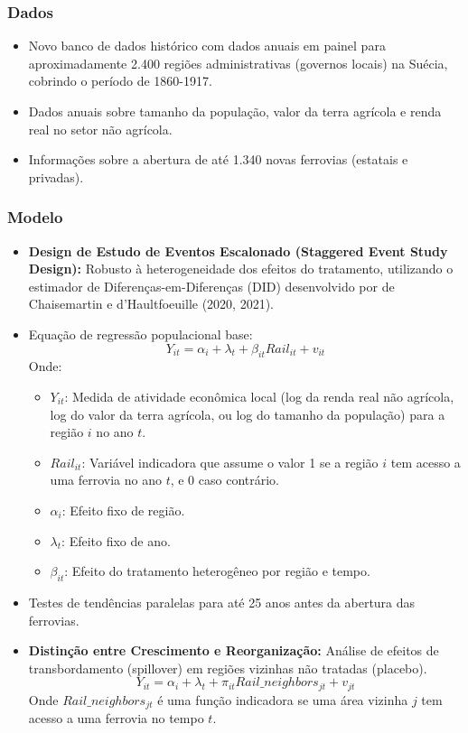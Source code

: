 \documentclass[12pt]{article}
\begin{document}
\subsubsection*{Dados}
\begin{itemize}
    \item Novo banco de dados histórico com dados anuais em painel para aproximadamente 2.400 regiões administrativas (governos locais) na Suécia, cobrindo o período de 1860-1917.
    \item Dados anuais sobre tamanho da população, valor da terra agrícola e renda real no setor não agrícola.
    \item Informações sobre a abertura de até 1.340 novas ferrovias (estatais e privadas).
\end{itemize}

\subsubsection*{Modelo}
\begin{itemize}
    \item \textbf{Design de Estudo de Eventos Escalonado (Staggered Event Study Design):} Robusto à heterogeneidade dos efeitos do tratamento, utilizando o estimador de Diferenças-em-Diferenças (DID) desenvolvido por de Chaisemartin e d'Haultfoeuille (2020, 2021).
    \item Equação de regressão populacional base:
    \begin{equation} \label{eq:sweden_event_study}
        Y_{it} = \alpha_i + \lambda_t + \beta_{it}Rail_{it} + v_{it}
    \end{equation}
    Onde:
    \begin{itemize}
        \item $Y_{it}$: Medida de atividade econômica local (log da renda real não agrícola, log do valor da terra agrícola, ou log do tamanho da população) para a região $i$ no ano $t$.
        \item $Rail_{it}$: Variável indicadora que assume o valor 1 se a região $i$ tem acesso a uma ferrovia no ano $t$, e 0 caso contrário.
        \item $\alpha_i$: Efeito fixo de região.
        \item $\lambda_t$: Efeito fixo de ano.
        \item $\beta_{it}$: Efeito do tratamento heterogêneo por região e tempo.
    \end{itemize}
    \item Testes de tendências paralelas para até 25 anos antes da abertura das ferrovias.
    \item \textbf{Distinção entre Crescimento e Reorganização:} Análise de efeitos de transbordamento (spillover) em regiões vizinhas não tratadas (placebo).
    \begin{equation} \label{eq:sweden_spillover}
        Y_{it} = \alpha_{i} + \lambda_{t} + \pi_{it}Rail\_neighbors_{jt} + v_{jt}
    \end{equation}
    Onde $Rail\_neighbors_{jt}$ é uma função indicadora se uma área vizinha $j$ tem acesso a uma ferrovia no tempo $t$.
\end{itemize}
\end{document}
